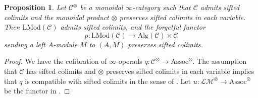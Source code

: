 \documentclass[10pt]{amsart}
\newtheorem{prop}[thm]{Proposition}
\theoremstyle{definition}
\numberwithin{equation}{section}
\newcommand{\cC}{\mathcal{C}}
\newcommand{\Alg}{\mathrm{Alg}}
\newcommand{\LMod}{\mathrm{LMod}}
\newcommand{\Assoc}{\mathrm{Assoc}}
\newcommand{\LM}{\mathcal{LM}}
\begin{document}
\begin{prop}
\label{left module sifted colimit}
Let $\cC^{\otimes}$ be a monoidal $\infty$-category such that $\cC$ admits sifted colimits and the monoidal product $\otimes$ preserves sifted colimits in each variable.
Then $\LMod(\cC)$ admits sifted colimits,
and the forgetful functor
\[
p
\colon
\LMod(\cC)
\to
\Alg(\cC) \times \cC
\]
sending a left $A$-module $M$ to $(A,M)$ preserves sifted colimits.
\end{prop}
\begin{proof}
We have the cofibration of $\infty$-operads $q\colon \cC^\otimes \to \Assoc^\otimes$.
The assumption that $\cC$ has sifted colimits and $\otimes$ preserves sifted colimits in each variable implies that $q$ is compatible with sifted colimits in the sense of \cite[Definition 3.1.1.18]{HA}.
Let $u\colon \LM^\otimes\to \Assoc^\otimes$ be the functor in \cite[Remark 4.2.1.9]{HA}.


\end{proof}
\end{document}
